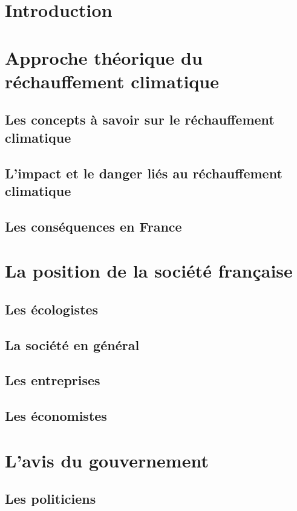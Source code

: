 \documentclass[a4paper,11pt]{article}
\begin{document}
\titleTMB 
\newpage
\tableofcontents
\newpage

\section*{Introduction}

\section{Approche théorique du réchauffement climatique}
\subsection{Les concepts à savoir sur le réchauffement climatique}
\subsection{L’impact et le danger liés au réchauffement climatique}
\subsection{Les conséquences en France}


\section{La position de la société française}
\subsection{Les écologistes}
\subsection{La société en général} 
\subsection{Les entreprises}
\subsection{Les économistes} 


\section{L’avis du gouvernement}
\subsection{Les politiciens}
\end{document}
